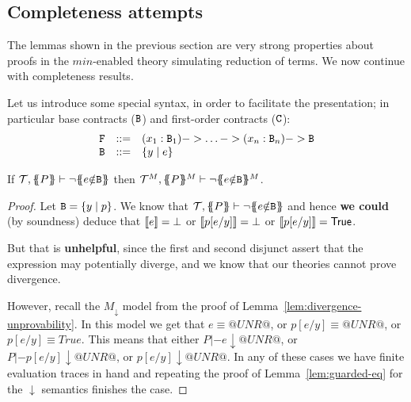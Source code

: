\documentclass[preprint]{sigplanconf}
\begin{document}
\subsection{Completeness attempts}

The lemmas shown in the previous section are very strong properties about proofs 
in the $min$-enabled theory simulating reduction of terms. We now continue with 
completeness results.

Let us introduce some special syntax, in order to facilitate the presentation;
in particular base contracts (${\tt B}$) and first-order contracts (${\tt C}$):
\[\begin{array}{lcl}
   { \tt F}   & ::= & (x_1:{\tt B}_1) -> \ldots -> (x_n:{\tt B}_n) -> {\tt B} \\ 
   {\tt B}   & ::= & \{ y \mid e \}
\end{array}\]

\begin{theorem}\label{lem:base-completeness}
If $\Th, \ptrans{}{P} \vdash \neg \ctrans{}{}{e{\notin}\Bt}$ then
$\Th^M, \ptrans{}{P}^M \vdash \neg \ctrans{}{}{e{\notin}\Bt}^M$.
\end{theorem}
\begin{proof}
Let ${\tt B} = \{ y \mid p \}$. We know that
$\Th, \ptrans{}{P} \vdash \neg \ctrans{}{}{e{\notin}\Bt}$ and hence
{\bf we could} (by soundness) deduce that 
$ [\![e]\!] = \bot$ or $[\![p[e/y]]\!] = \bot$ or $[\![p[e/y]]\!] = \mathsf{True}$.

But that is {\bf unhelpful}, since the first and second disjunct assert that the 
expression may potentially diverge, and we know that our theories cannot prove divergence.

However, recall the $M_{\downarrow}$ model from the proof of Lemma~\ref{lem:divergence-unprovability}.
In this model we get that $e \equiv @UNR@$, or $p[e/y] \equiv @UNR@$, or $p[e/y] \equiv True$. This
means that either $P |- e \downarrow @UNR@$, or $P |- p[e/y] \downarrow @UNR@$, or 
$p[e/y] \downarrow @UNR@$. In any of these cases we have finite evaluation traces in hand
and repeating the proof of Lemma~\ref{lem:guarded-eq} for the $\downarrow$ semantics finishes 
the case.
\end{proof}
\end{document}

